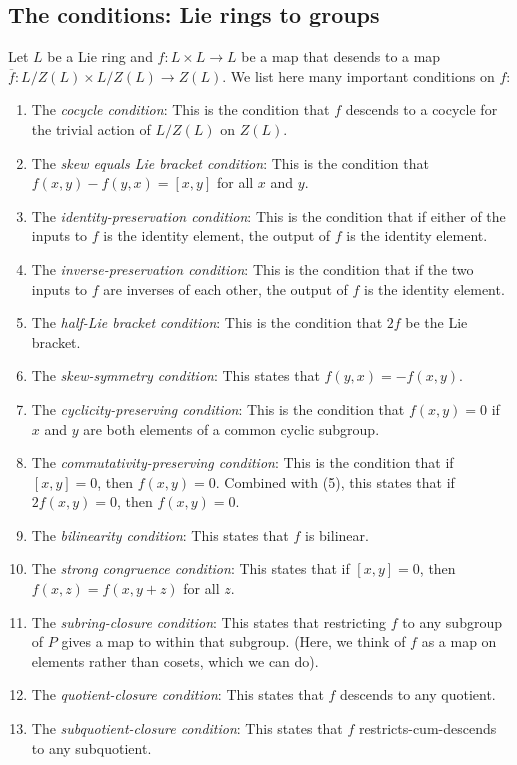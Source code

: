\documentclass[10pt]{amsart}
\begin{document}
\subsection{The conditions: Lie rings to groups}

Let $L$ be a Lie ring and $f:L \times L \to L$ be a map that desends
to a map $\overline{f}: L/Z(L) \times L/Z(L) \to Z(L)$. We list here
many important conditions on $f$:

\begin{enumerate}
\item The {\em cocycle condition}: This is the condition that $f$
  descends to a cocycle for the trivial action of $L/Z(L)$ on $Z(L)$.
\item The {\em skew equals Lie bracket condition}: This is the
  condition that $f(x,y) - f(y,x) = [x,y]$ for all $x$ and $y$.
\item The {\em identity-preservation condition}: This is the condition
  that if either of the inputs to $f$ is the identity element, the
  output of $f$ is the identity element.
\item The {\em inverse-preservation condition}: This is the condition
  that if the two inputs to $f$ are inverses of each other, the output
  of $f$ is the identity element.
\item The {\em half-Lie bracket condition}: This is the condition that
  $2f$ be the Lie bracket.
\item The {\em skew-symmetry condition}: This states that $f(y,x) =
  -f(x,y)$.
\item The {\em cyclicity-preserving condition}: This is the condition
  that $f(x,y) = 0$ if $x$ and $y$ are both elements of a common
  cyclic subgroup.
\item The {\em commutativity-preserving condition}: This is the
  condition that if $[x,y] = 0$, then $f(x,y) = 0$. Combined with (5),
  this states that if $2f(x,y) = 0$, then $f(x,y) = 0$.
\item The {\em bilinearity condition}: This states that $f$ is
  bilinear.
\item The {\em strong congruence condition}: This states that if
  $[x,y] = 0$, then $f(x,z) = f(x,y + z)$ for all $z$.
\item The {\em subring-closure condition}: This states that
  restricting $f$ to any subgroup of $P$ gives a map to within that
  subgroup. (Here, we think of $f$ as a map on elements rather than
  cosets, which we can do).
\item The {\em quotient-closure condition}: This states that $f$
  descends to any quotient.
\item The {\em subquotient-closure condition}: This states that $f$
  restricts-cum-descends to any subquotient.
\end{enumerate}
\end{document}
